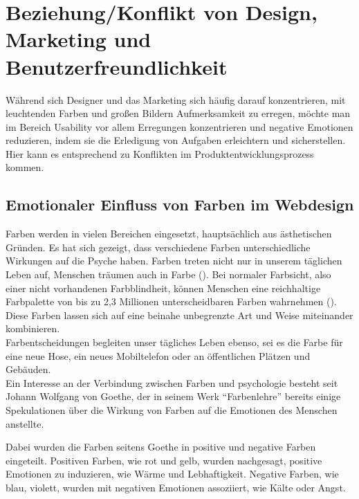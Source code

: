 \documentclass[./dokumentation.tex]{subfiles}
\begin{document}
\chapter{Beziehung/Konflikt von Design, Marketing und Benutzerfreundlichkeit}
Während sich Designer und das Marketing sich häufig darauf konzentrieren, mit leuchtenden Farben und großen Bildern Aufmerksamkeit zu erregen, möchte man im Bereich Usability vor allem Erregungen konzentrieren und negative Emotionen reduzieren, indem sie die Erledigung von Aufgaben erleichtern und sicherstellen. Hier kann es entsprechend zu Konflikten im Produktentwicklungsprozess kommen. 


\section{Emotionaler Einfluss von Farben im Webdesign}
Farben werden in vielen Bereichen eingesetzt, hauptsächlich aus ästhetischen Gründen. Es hat sich gezeigt, dass verschiedene Farben unterschiedliche Wirkungen auf die Psyche haben. Farben treten nicht nur in unserem täglichen Leben auf, Menschen träumen auch in Farbe (\cite{rechtschaffen1992}). Bei normaler Farbsicht, also einer nicht vorhandenen Farbblindheit, können Menschen eine reichhaltige Farbpalette von bis zu 2,3 Millionen unterscheidbaren Farben wahrnehmen (\cite{linhares2008}). Diese Farben lassen sich auf eine beinahe unbegrenzte Art und Weise miteinander kombinieren. \\
Farbentscheidungen begleiten unser tägliches Leben ebenso, sei es die Farbe für eine neue Hose, ein neues Mobiltelefon oder an öffentlichen Plätzen und Gebäuden. \\
Ein Interesse an der Verbindung zwischen Farben und psychologie besteht seit Johann Wolfgang von Goethe, der in seinem Werk “Farbenlehre” bereits einige Spekulationen über die Wirkung von Farben auf die Emotionen des Menschen anstellte. 

Dabei wurden die Farben seitens Goethe in positive und negative Farben eingeteilt. Positiven Farben, wie rot und gelb, wurden nachgesagt, positive Emotionen zu induzieren, wie Wärme und Lebhaftigkeit. Negative Farben, wie blau, violett, wurden mit negativen Emotionen assoziiert, wie Kälte oder Angst.\\
\end{document}
